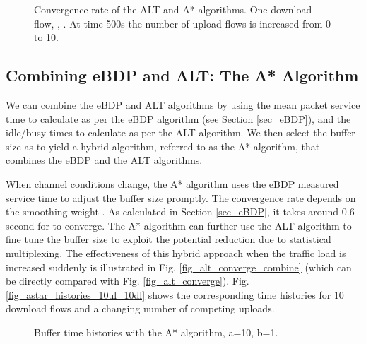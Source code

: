 \documentclass[10pt,twocolumn, journal]{IEEEtran}
\begin{document}
\begin{figure}[tb]
   \centering
   \caption{Convergence rate of the ALT and A* algorithms.
   One download flow, , .
   At time 500s the number of upload flows is increased from 0 to 10.}
\end{figure}


\subsection{Combining eBDP and ALT: The A* Algorithm}\label{subsec_final}

We can combine the eBDP and ALT algorithms by using the mean packet service time to calculate  as per the eBDP algorithm (see Section \ref{sec_eBDP}), and the idle/busy times to calculate  as per the ALT algorithm.   We then select the buffer size as  to yield a hybrid  algorithm, referred to as the A* algorithm, that combines the eBDP and the ALT algorithms.

When channel conditions change, the A* algorithm uses the eBDP measured service
time to adjust the buffer size promptly. The convergence rate depends on the smoothing
weight . As calculated in Section \ref{sec_eBDP}, it takes around 0.6 second for
 to converge. The A* algorithm can further use the ALT algorithm to fine tune
the buffer size to exploit the potential reduction due to statistical multiplexing. The
effectiveness of this hybrid approach when the traffic load is increased suddenly is
illustrated in Fig. \ref{fig_alt_converge_combine} (which can be directly compared with Fig. \ref{fig_alt_converge}).   Fig. \ref{fig_astar_histories_10ul_10dl} shows the corresponding time histories for 10 download flows and a changing number of competing uploads.

\begin{figure}[tb]
   \centering
   \caption{Buffer time histories with the A* algorithm, a=10, b=1.}
   \label{fig_astar_histories}
\end{figure}
\end{document}
